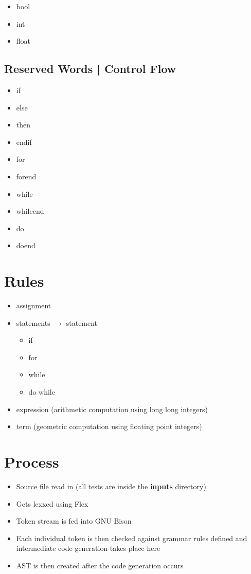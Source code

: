 \documentclass{article}
\begin{document}
\begin{itemize}
\item bool
\item int
\item float
\end{itemize}

\subsection{Reserved Words | Control Flow}

\begin{itemize}
\item if
\item else
\item then
\item endif
\item for
\item forend
\item while
\item whileend
\item do
\item doend
\end{itemize}

\section{Rules}

\begin{itemize}
\item assignment
\item statements $\rightarrow$ statement
\begin{itemize}
\item if
\item for
\item while
\item do while
\end{itemize}
\item expression (arithmetic computation using long long integers)
\item term (geometric computation using floating point integers)
\end{itemize}


\newpage

\section{Process}

\begin{itemize}
\item Source file read in (all tests are inside the \textbf{inputs} directory)
\item Gets lexxed using Flex
\item Token stream is fed into GNU Bison
\item Each individual token is then checked against grammar rules defined and intermediate code generation takes place here
\item AST is then created after the code generation occurs
\end{itemize}
\end{document}
